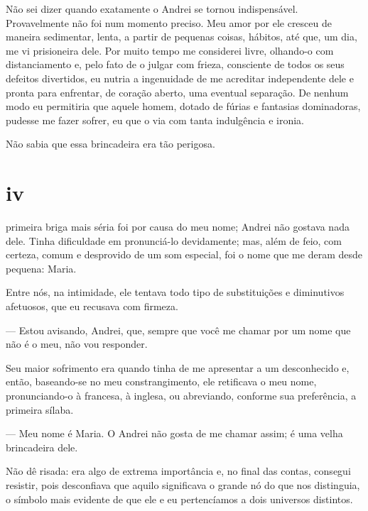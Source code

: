 Não sei dizer quando exatamente o Andrei se tornou indispensável.
Provavelmente não foi num momento preciso. Meu amor por ele cresceu de
maneira sedimentar, lenta, a partir de pequenas coisas, hábitos, até
que, um dia, me vi prisioneira dele. Por muito tempo me considerei
livre, olhando-o com distanciamento e, pelo fato de o julgar com frieza,
consciente de todos os seus defeitos divertidos, eu nutria a ingenuidade
de me acreditar independente dele e pronta para enfrentar, de coração
aberto, uma eventual separação. De nenhum modo eu permitiria que aquele
homem, dotado de fúrias e fantasias dominadoras, pudesse me fazer
sofrer, eu que o via com tanta indulgência e ironia.


Não sabia que essa brincadeira era tão perigosa.

\section{iv}

 primeira briga mais séria foi por causa do meu nome; Andrei não
gostava nada dele. Tinha dificuldade em pronunciá-lo devidamente; mas, além de feio, com
certeza, comum e desprovido de um som especial, foi o nome que me deram
desde pequena: Maria.

Entre nós, na intimidade, ele tentava todo tipo de substituições e
diminutivos afetuosos, que eu recusava com firmeza.

--- Estou avisando, Andrei, que, sempre que você me chamar por um nome
que não é o meu, não vou responder.

Seu maior sofrimento era quando tinha de me apresentar a um desconhecido
e, então, baseando-se no meu constrangimento, ele retificava o meu nome,
pronunciando-o à francesa, à inglesa, ou abreviando, conforme sua
preferência, a primeira sílaba.


--- Meu nome é Maria. O Andrei não gosta de me chamar assim; é uma velha
brincadeira dele.

Não dê risada: era algo de extrema importância e, no final das contas,
consegui resistir, pois desconfiava que aquilo significava o grande nó
do que nos distinguia, o símbolo mais evidente de que ele e eu
pertencíamos a dois universos distintos.

